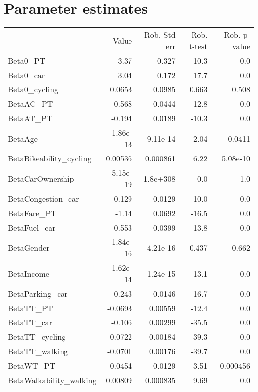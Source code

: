 \section{Parameter estimates}
\begin{tabular}{lrrrr}
 & Value & Rob. Std err & Rob. t-test & Rob. p-value \\
Beta0_PT & 3.37 & 0.327 & 10.3 & 0.0 \\
Beta0_car & 3.04 & 0.172 & 17.7 & 0.0 \\
Beta0_cycling & 0.0653 & 0.0985 & 0.663 & 0.508 \\
BetaAC_PT & -0.568 & 0.0444 & -12.8 & 0.0 \\
BetaAT_PT & -0.194 & 0.0189 & -10.3 & 0.0 \\
BetaAge & 1.86e-13 & 9.11e-14 & 2.04 & 0.0411 \\
BetaBikeability_cycling & 0.00536 & 0.000861 & 6.22 & 5.08e-10 \\
BetaCarOwnership & -5.15e-19 & 1.8e+308 & -0.0 & 1.0 \\
BetaCongestion_car & -0.129 & 0.0129 & -10.0 & 0.0 \\
BetaFare_PT & -1.14 & 0.0692 & -16.5 & 0.0 \\
BetaFuel_car & -0.553 & 0.0399 & -13.8 & 0.0 \\
BetaGender & 1.84e-16 & 4.21e-16 & 0.437 & 0.662 \\
BetaIncome & -1.62e-14 & 1.24e-15 & -13.1 & 0.0 \\
BetaParking_car & -0.243 & 0.0146 & -16.7 & 0.0 \\
BetaTT_PT & -0.0693 & 0.00559 & -12.4 & 0.0 \\
BetaTT_car & -0.106 & 0.00299 & -35.5 & 0.0 \\
BetaTT_cycling & -0.0722 & 0.00184 & -39.3 & 0.0 \\
BetaTT_walking & -0.0701 & 0.00176 & -39.7 & 0.0 \\
BetaWT_PT & -0.0454 & 0.0129 & -3.51 & 0.000456 \\
BetaWalkability_walking & 0.00809 & 0.000835 & 9.69 & 0.0 \\
\end{tabular}

